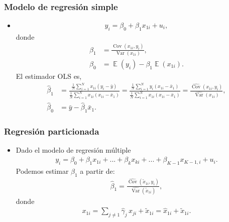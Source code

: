 \documentclass[t, compress, spanish, aspectratio=169]{beamer}
\DeclareMathOperator{\Var}{Var}
\DeclareMathOperator{\Cov}{Cov}
\DeclareMathOperator{\E}{\mathbb{E}}
\begin{document}
	\begin{frame}
		\frametitle{Modelo de regresi\'on simple}
		\begin{itemize}
			\item []
			\begin{align*}
				y_i = \beta_0 + \beta_1 x_{1i}+u_i,
			\end{align*}
			donde
			\begin{align*}
				\beta_1 &= \frac{\Cov(x_{1i}, y_i)}{\Var(x_{1i})},\\
				\beta_0 &= \E(y_i)-\beta_1\E(x_{1i}).
			\end{align*}
			El estimador OLS es,
				\begin{align*}
					\hat \beta_1 &=\frac{\frac{1}{N}\sum_{i=1}^{N} x_{1i}(y_{i}-\bar y)}{\frac{1}{N}\sum_{i=1}^{N} x_{1i}(x_{1i}-\bar x_1)}=\frac{\frac{1}{N}\sum_{i=1}^{N} y_{i}(x_{1i}-\bar x_1)}{\frac{1}{N}\sum_{i=1}^{N} x_{1i}(x_{1i}-\bar x_1)} =\frac{\widehat{\Cov}(x_{1i},y_i)}{\widehat{\Var}(x_{1i})}, \\
					\hat \beta_0 &=\bar y - \hat \beta_1 \bar x_1.
				\end{align*}
		\end{itemize}
	\end{frame}
	\begin{frame}
		\frametitle{Regresi\'on particionada}
		\begin{itemize}
			\item <1->[] Dado el modelo de regresi\'on m\'ultiple
			\begin{align*}
				y_i = \beta_0+\beta_1x_{1i}+...+\beta_k x_{ki} +...+\beta_{K-1} x_{K-1,i}+ u_i.
			\end{align*}
			Podemos estimar $\beta_1$ a partir de:
			\begin{align*}
				\hat \beta_{1} = \frac{\widehat{\Cov}(\tilde x_{1i},y_i)}{\widehat{\Var}(\tilde x_{1i})},
			\end{align*}
			donde
			\begin{align*}
				x_{1i} = \sum_{j\neq 1} \hat \gamma_j \, x_{ji}+\tilde x_{1i} =\hat x_{1i}+\tilde x_{1i}.
			\end{align*}
		\end{itemize}
	\end{frame}
\end{document}

